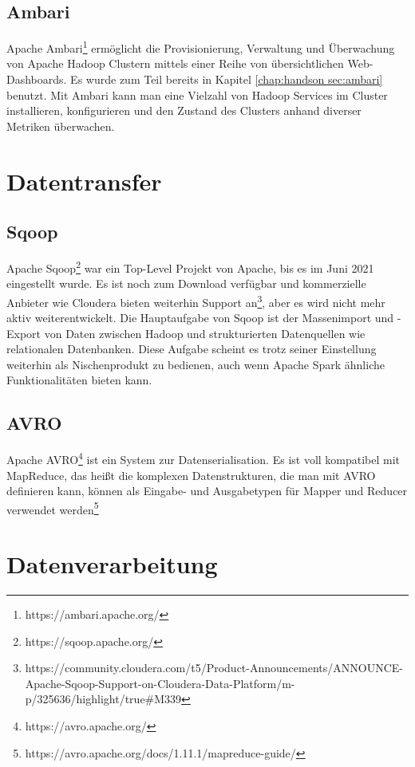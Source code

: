 \subsection{Ambari}
Apache Ambari\footnote{https://ambari.apache.org/} ermöglicht die Provisionierung, Verwaltung und Überwachung von Apache Hadoop Clustern mittels einer Reihe von übersichtlichen Web-Dashboards. Es wurde zum Teil bereits in Kapitel \ref{chap:handson sec:ambari} benutzt. Mit Ambari kann man eine Vielzahl von Hadoop Services im Cluster installieren, konfigurieren und den Zustand des Clusters anhand diverser Metriken überwachen.

\section{Datentransfer}
\subsection{Sqoop}
Apache Sqoop\footnote{https://sqoop.apache.org/} war ein Top-Level Projekt von Apache, bis es im Juni 2021 eingestellt wurde. Es ist noch zum Download verfügbar und kommerzielle Anbieter wie Cloudera bieten weiterhin Support an\footnote{https://community.cloudera.com/t5/Product-Announcements/ANNOUNCE-Apache-Sqoop-Support-on-Cloudera-Data-Platform/m-p/325636/highlight/true\#M339}, aber es wird nicht mehr aktiv weiterentwickelt. Die Hauptaufgabe von Sqoop ist der Massenimport und -Export von Daten zwischen Hadoop und strukturierten Datenquellen wie relationalen Datenbanken. Diese Aufgabe scheint es trotz seiner Einstellung weiterhin als Nischenprodukt zu bedienen, auch wenn Apache Spark ähnliche Funktionalitäten bieten kann.\cite{cloudera_moderator_using_2021} 
\subsection{AVRO}
Apache AVRO\footnote{https://avro.apache.org/} ist ein System zur Datenserialisation. Es ist voll kompatibel mit MapReduce, das heißt die komplexen Datenstrukturen, die man mit AVRO definieren kann, können als Eingabe- und Ausgabetypen für Mapper und Reducer verwendet werden\footnote{https://avro.apache.org/docs/1.11.1/mapreduce-guide/}

\section{Datenverarbeitung}
